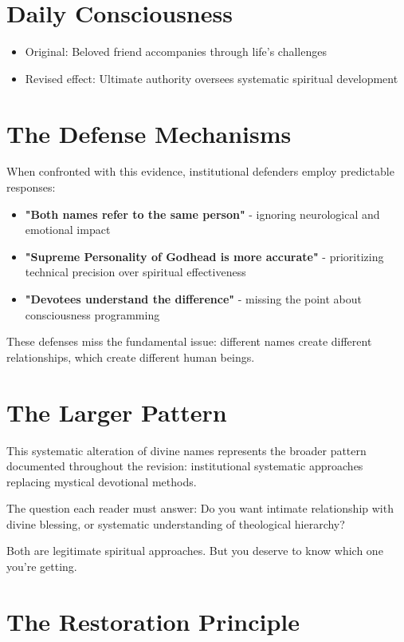 \documentclass[11pt,twoside]{book}
\begin{document}
\section*{Daily Consciousness}
\label{sec:orga208e81}
\begin{itemize}
\item Original: Beloved friend accompanies through life's challenges
\item Revised effect: Ultimate authority oversees systematic spiritual development
\end{itemize}
\section*{The Defense Mechanisms}
\label{sec:org64d1d09}

When confronted with this evidence, institutional defenders employ predictable responses:

\begin{itemize}
\item \textbf{\textbf{"Both names refer to the same person"}} - ignoring neurological and emotional impact
\item \textbf{\textbf{"Supreme Personality of Godhead is more accurate"}} - prioritizing technical precision over spiritual effectiveness
\item \textbf{\textbf{"Devotees understand the difference"}} - missing the point about consciousness programming
\end{itemize}

These defenses miss the fundamental issue: different names create different relationships, which create different human beings.
\section*{The Larger Pattern}
\label{sec:org7665798}

This systematic alteration of divine names represents the broader pattern documented throughout the revision: institutional systematic approaches replacing mystical devotional methods.

The question each reader must answer: Do you want intimate relationship with divine blessing, or systematic understanding of theological hierarchy?

Both are legitimate spiritual approaches. But you deserve to know which one you're getting.
\section*{The Restoration Principle}
\label{sec:org8a7e062}
\end{document}
